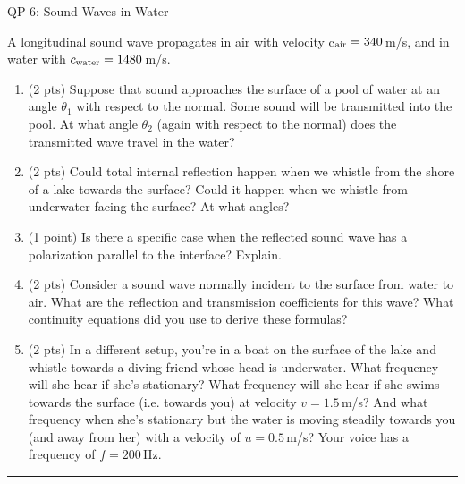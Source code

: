 \documentclass[12pt]{article}
\begin{document}
%
\begin{centering}
\LARGE{QP 6: Sound Waves in Water}
\end{centering}
\bigskip
\bigskip

A longitudinal sound wave propagates in air with velocity
c$_{\rm air} = 340$\,m/s, and in water with $c_{\rm water} = 1480$\,m/s.

\begin{enumerate}[label=(\alph*)]
\item (2 pts)
Suppose that sound approaches the surface of a pool of water at an angle $\theta_1$ with respect to
the normal. Some sound will be transmitted into the pool. At what angle $\theta_2$ (again with respect to
the normal) does the transmitted wave travel in the water?

\item (2 pts)
Could total internal reflection happen when we whistle from the shore of a lake towards the
surface? Could it happen when we whistle from underwater facing the surface? At what angles?

\item (1 point)
Is there a specific case when the reflected sound wave has a polarization parallel to the
interface? Explain.

\item (2 pts)
Consider a sound wave normally incident to the surface from water to air. What are the
reflection and transmission coefficients for this wave? What continuity equations did you use to derive
these formulas?

\item (2 pts)
In a different setup, you're in a boat on the surface of the lake and whistle towards a diving
friend whose head is underwater. What frequency will she hear if she's stationary? What frequency
will she hear if she swims towards the surface (i.e. towards you) at velocity $v = 1.5$\,m/s?
And what
frequency when she's stationary but the water is moving steadily towards you (and away from her)
with a velocity of $u = 0.5$\,m/s? Your voice has a frequency of $f = 200$\,Hz.

\end{enumerate}
\bigskip
{\color{Sepia} \hrule}
\end{document}
